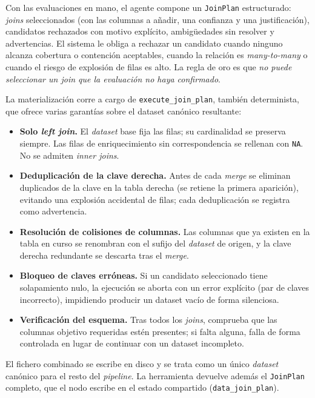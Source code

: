 Con las evaluaciones en mano, el agente compone un \texttt{JoinPlan} estructurado:
\textit{joins} seleccionados (con las columnas a añadir, una confianza y una
justificación), candidatos rechazados con motivo explícito, ambigüedades sin resolver y
advertencias. El sistema le obliga a rechazar un candidato cuando ninguno alcanza
cobertura o contención aceptables, cuando la relación es \textit{many-to-many} o cuando el
riesgo de explosión de filas es alto. La regla de oro es que \emph{no puede seleccionar un
\textit{join} que la evaluación no haya confirmado}.

La materialización corre a cargo de \texttt{execute\_join\_plan}, también determinista,
que ofrece varias garantías sobre el dataset canónico resultante:

\begin{itemize}
  \item \textbf{Solo \textit{left join}.} El \textit{dataset} base fija las filas; su
        cardinalidad se preserva siempre. Las filas de enriquecimiento sin
        correspondencia se rellenan con \texttt{NA}. No se admiten \textit{inner joins}.
  \item \textbf{Deduplicación de la clave derecha.} Antes de cada \textit{merge} se
        eliminan duplicados de la clave en la tabla derecha (se retiene la primera
        aparición), evitando una explosión accidental de filas; cada deduplicación se
        registra como advertencia.
  \item \textbf{Resolución de colisiones de columnas.} Las columnas que ya existen en la
        tabla en curso se renombran con el sufijo del \textit{dataset} de origen, y la
        clave derecha redundante se descarta tras el \textit{merge}.
  \item \textbf{Bloqueo de claves erróneas.} Si un candidato seleccionado tiene
        solapamiento nulo, la ejecución se aborta con un error explícito (par de claves
        incorrecto), impidiendo producir un dataset vacío de forma silenciosa.
  \item \textbf{Verificación del esquema.} Tras todos los \textit{joins}, comprueba que
        las columnas objetivo requeridas estén presentes; si falta alguna, falla de forma
        controlada en lugar de continuar con un dataset incompleto.
\end{itemize}

El fichero combinado se escribe en disco y se trata como un único \textit{dataset}
canónico para el resto del \textit{pipeline}. La herramienta devuelve además el
\texttt{JoinPlan} completo, que el nodo escribe en el estado compartido
(\texttt{data\_join\_plan}).

